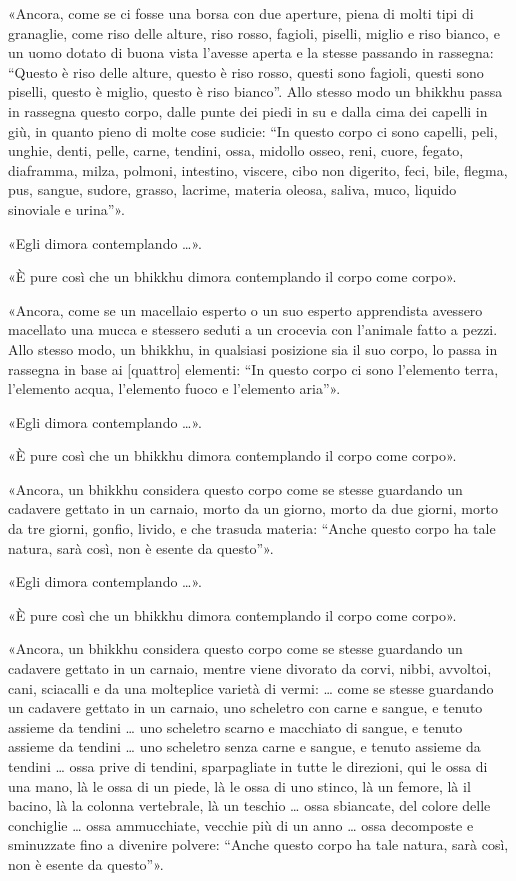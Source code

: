 «Ancora, come se ci fosse una borsa con due aperture, piena di molti tipi di
granaglie, come riso delle alture, riso rosso, fagioli, piselli, miglio e riso
bianco, e un uomo dotato di buona vista l’avesse aperta e la stesse passando in
rassegna: “Questo è riso delle alture, questo è riso rosso, questi sono fagioli,
questi sono piselli, questo è miglio, questo è riso bianco”. Allo stesso modo un
bhikkhu passa in rassegna questo corpo, dalle punte dei piedi in su e dalla cima
dei capelli in giù, in quanto pieno di molte cose sudicie: “In questo corpo ci
sono capelli, peli, unghie, denti, pelle, carne, tendini, ossa, midollo osseo,
reni, cuore, fegato, diaframma, milza, polmoni, intestino, viscere, cibo non
digerito, feci, bile, flegma, pus, sangue, sudore, grasso, lacrime, materia
oleosa, saliva, muco, liquido sinoviale e urina”».

«Egli dimora contemplando …».

«È pure così che un bhikkhu dimora contemplando il corpo come corpo».

«Ancora, come se un macellaio esperto o un suo esperto apprendista avessero
macellato una mucca e stessero seduti a un crocevia con l’animale fatto a pezzi.
Allo stesso modo, un bhikkhu, in qualsiasi posizione sia il suo corpo, lo passa
in rassegna in base ai [quattro] elementi: “In questo corpo ci sono l’elemento
terra, l’elemento acqua, l’elemento fuoco e l’elemento aria”».

«Egli dimora contemplando …».

«È pure così che un bhikkhu dimora contemplando il corpo come corpo».

\label{pag270}%
«Ancora, un bhikkhu considera questo corpo come se stesse guardando un cadavere
gettato in un carnaio, morto da un giorno, morto da due giorni, morto da tre
giorni, gonfio, livido, e che trasuda materia: “Anche questo corpo ha tale
natura, sarà così, non è esente da questo”».

«Egli dimora contemplando …».

«È pure così che un bhikkhu dimora contemplando il corpo come corpo».

«Ancora, un bhikkhu considera questo corpo come se stesse guardando un cadavere
gettato in un carnaio, mentre viene divorato da corvi, nibbi, avvoltoi, cani,
sciacalli e da una molteplice varietà di vermi: … come se stesse guardando un
cadavere gettato in un carnaio, uno scheletro con carne e sangue, e tenuto
assieme da tendini … uno scheletro scarno e macchiato di sangue, e tenuto
assieme da tendini … uno scheletro senza carne e sangue, e tenuto assieme da
tendini … ossa prive di tendini, sparpagliate in tutte le direzioni, qui le ossa
di una mano, là le ossa di un piede, là le ossa di uno stinco, là un femore, là
il bacino, là la colonna vertebrale, là un teschio … ossa sbiancate, del colore
delle conchiglie … ossa ammucchiate, vecchie più di un anno … ossa decomposte e
sminuzzate fino a divenire polvere: “Anche questo corpo ha tale natura, sarà
così, non è esente da questo”».

